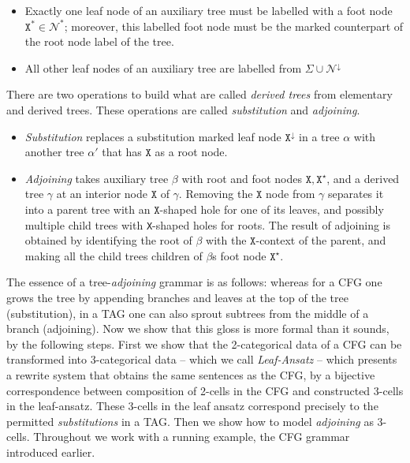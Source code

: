\begin{fullwidth}
\begin{defn}
\begin{itemize}
{\begin{itemize}
{\begin{itemize}
			\item{Exactly one leaf node of an auxiliary tree must be labelled with a foot node $\texttt{X}^{*} \in \mathcal{N}^{*}$; moreover, this labelled foot node must be the marked counterpart of the root node label of the tree.}
			\item{All other leaf nodes of an auxiliary tree are labelled from $\Sigma \cup \mathcal{N}^{\downarrow}$}
		\end{itemize}
		}
	\end{itemize}
	}
\end{itemize}
There are two operations to build what are called \emph{derived trees} from elementary and derived trees. These operations are called \emph{substitution} and \emph{adjoining}.
\begin{itemize}
	\item{\emph{Substitution} replaces a substitution marked leaf node $\texttt{X}^\downarrow$ in a tree $\alpha$ with another tree $\alpha'$ that has $\texttt{X}$ as a root node.}
	\item{\emph{Adjoining} takes auxiliary tree $\beta$ with root and foot nodes $\texttt{X},\texttt{X}^\star$, and a derived tree $\gamma$ at an interior node $\texttt{X}$ of $\gamma$. Removing the $\texttt{X}$ node from $\gamma$ separates it into a parent tree with an $\texttt{X}$-shaped hole for one of its leaves, and possibly multiple child trees with \texttt{X}-shaped holes for roots. The result of adjoining is obtained by identifying the root of $\beta$ with the $\texttt{X}$-context of the parent, and making all the child trees children of $\beta$s foot node $\texttt{X}^\star$.}
\end{itemize}
\end{defn}

The essence of a tree-\emph{adjoining} grammar is as follows: whereas for a CFG one grows the tree by appending branches and leaves at the top of the tree (substitution), in a TAG one can also sprout subtrees from the middle of a branch (adjoining). Now we show that this gloss is more formal than it sounds, by the following steps. First we show that the 2-categorical data of a CFG can be transformed into 3-categorical data -- which we call \emph{Leaf-Ansatz} -- which presents a rewrite system that obtains the same sentences as the CFG, by a bijective correspondence between composition of 2-cells in the CFG and constructed 3-cells in the leaf-ansatz. These 3-cells in the leaf ansatz correspond precisely to the permitted \emph{substitutions} in a TAG. Then we show how to model \emph{adjoining} as 3-cells. Throughout we work with a running example, the CFG grammar introduced earlier.


\end{fullwidth}

